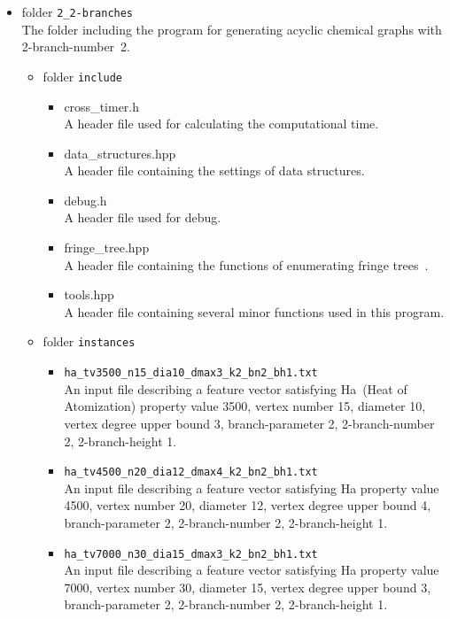 \documentclass[11pt,titlepage,dvipdfmx,twoside]{article}
\begin{document}
\begin{itemize}

\item folder {\tt 2\_2-branches}\\
	The folder including the program for generating acyclic chemical graphs with 2-branch-number~2.
	\begin{itemize}
	\item folder {\tt include}
		\begin{itemize}
			\item{cross\_timer.h}\\
				A header file used for calculating the computational time.
				
			\item{data\_structures.hpp}\\
				A header file containing the settings of data structures.
				
			\item{debug.h}\\
				A header file used for debug.
				
			\item{fringe\_tree.hpp}\\
				A header file containing the functions of enumerating fringe trees~\cite{branch}.		
						
			\item{tools.hpp}\\
				A header file containing several minor functions used in this program.
	
		\end{itemize}
	\item folder {\tt instances}
		\begin{itemize}
			\item{\tt ha\_tv3500\_n15\_dia10\_dmax3\_k2\_bn2\_bh1.txt}\\
				An input file describing a feature vector satisfying Ha~(Heat of Atomization) property value 3500, 
				vertex number 15, diameter 10, vertex degree upper bound 3, branch-parameter 2,
				2-branch-number 2, 2-branch-height 1.

			\item{\tt ha\_tv4500\_n20\_dia12\_dmax4\_k2\_bn2\_bh1.txt}\\
				An input file describing a feature vector satisfying Ha property value 4500, 
				vertex number 20, diameter 12, vertex degree upper bound 4, branch-parameter 2,
				2-branch-number 2, 2-branch-height 1.
				
			\item{\tt ha\_tv7000\_n30\_dia15\_dmax3\_k2\_bn2\_bh1.txt}\\
				An input file describing a feature vector satisfying Ha property value 7000, 
				vertex number 30, diameter 15, vertex degree upper bound 3, branch-parameter 2,
				2-branch-number 2, 2-branch-height 1.


\end{itemize}
\end{itemize}
\end{itemize}
\end{document}
